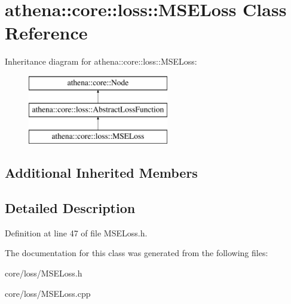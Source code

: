 \hypertarget{classathena_1_1core_1_1loss_1_1_m_s_e_loss}{}\section{athena\+:\+:core\+:\+:loss\+:\+:M\+S\+E\+Loss Class Reference}
\label{classathena_1_1core_1_1loss_1_1_m_s_e_loss}
Inheritance diagram for athena\+:\+:core\+:\+:loss\+:\+:M\+S\+E\+Loss\+:\begin{figure}[H]
\begin{center}
\leavevmode
\includegraphics[height=3.000000cm]{dc/d9a/classathena_1_1core_1_1loss_1_1_m_s_e_loss}
\end{center}
\end{figure}
\subsection*{Additional Inherited Members}


\subsection{Detailed Description}


Definition at line 47 of file M\+S\+E\+Loss.\+h.



The documentation for this class was generated from the following files\+:\begin{DoxyCompactItemize}
\item 
core/loss/M\+S\+E\+Loss.\+h\item 
core/loss/M\+S\+E\+Loss.\+cpp\end{DoxyCompactItemize}
